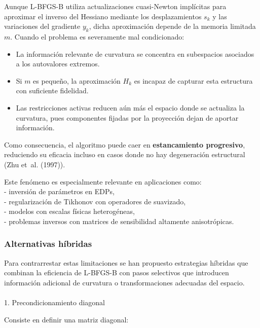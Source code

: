 \documentclass[
  spanish,
  us-letterpaper,
  DIV=11,
  numbers=noendperiod]{scrreprt}
\makeatletter
\let\oldparagraph\paragraph
\renewcommand{\paragraph}{
    \@ifstar
      \xxxParagraphStar
      \xxxParagraphNoStar
  }
\newcommand{\xxxParagraphStar}[1]{\oldparagraph*{#1}\mbox{}}
\newcommand{\xxxParagraphNoStar}[1]{\oldparagraph{#1}\mbox{}}
\providecommand{\tightlist}{%
  \setlength{\itemsep}{0pt}\setlength{\parskip}{0pt}}
\numberwithin{equation}{section}
\makeatother
\begin{document}
Aunque L-BFGS-B utiliza actualizaciones cuasi-Newton implícitas para
aproximar el inverso del Hessiano mediante los desplazamientos \(s_k\) y
las variaciones del gradiente \(y_k\), dicha aproximación depende de la
memoria limitada \(m\). Cuando el problema es severamente mal
condicionado:

\begin{itemize}
\tightlist
\item
  La información relevante de curvatura se concentra en subespacios
  asociados a los autovalores extremos.
\item
  Si \(m\) es pequeño, la aproximación \(H_k\) es incapaz de capturar
  esta estructura con suficiente fidelidad.
\item
  Las restricciones activas reducen aún más el espacio donde se
  actualiza la curvatura, pues componentes fijadas por la proyección
  dejan de aportar información.
\end{itemize}

Como consecuencia, el algoritmo puede caer en \textbf{estancamiento
progresivo}, reduciendo su eficacia incluso en casos donde no hay
degeneración estructural (Zhu et~al. (1997)).

Este fenómeno es especialmente relevante en aplicaciones como:\\
- inversión de parámetros en EDPs,\\
- regularización de Tikhonov con operadores de suavizado,\\
- modelos con escalas físicas heterogéneas,\\
- problemas inversos con matrices de sensibilidad altamente
anisotrópicas.

\subsubsection{Alternativas híbridas}\label{alternativas-huxedbridas}

Para contrarrestar estas limitaciones se han propuesto estrategias
híbridas que combinan la eficiencia de L-BFGS-B con pasos selectivos que
introducen información adicional de curvatura o transformaciones
adecuadas del espacio.

\paragraph{1. Precondicionamiento
diagonal}\label{precondicionamiento-diagonal}

Consiste en definir una matriz diagonal:
\end{document}
